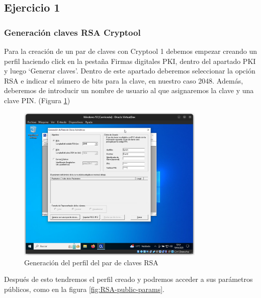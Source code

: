 \subsection{Ejercicio 1}
\graphicspath{ {img/01} }


\subsubsection{Generación claves RSA Cryptool}

Para la creación de un par de claves con Cryptool 1 debemos empezar creando un perfil haciendo click en la pestaña Firmas digitales PKI, dentro del apartado PKI y luego `Generar claves'.
Dentro de este apartado deberemos seleccionar la opción RSA e indicar el número de bits para la clave, en nuestro caso 2048.
Además, deberemos de introducir un nombre de usuario al que asignaremos la clave y una clave PIN. (Figura \ref{fig:RSA-profile})

\begin{figure}[H]
    \centering
    \includegraphics[width=0.8\textwidth]{ClavesRSA-01.png}
    \caption{Generación del perfil del par de claves RSA}
    \label{fig:RSA-profile}
\end{figure}

Después de esto tendremos el perfil creado y podremos acceder a sus parámetros públicos, como en la figura \ref{fig:RSA-public-params}.

